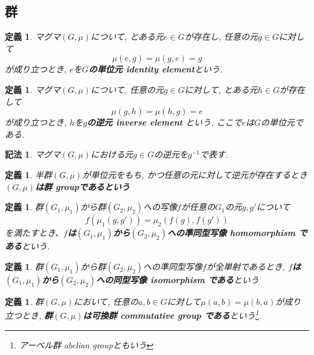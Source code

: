 \documentclass[dvipdfmx]{jsbook}
\theoremstyle{plain}
\newtheorem{Def}[thm]{定義}
\newtheorem{Notation}[thm]{記法}
\begin{document}
\subsection{群}
\begin{Def}
マグマ$(G,\mu)$について, とある元$e\in G$が存在し, 任意の元$g\in G$に対して\[\mu(e,g)=\mu(g,e)=g\]が成り立つとき, $e$を{\bf $G$の単位元 identity element}という.
\end{Def}
\begin{Def}
マグマ$(G,\mu)$について, 任意の元$g\in G$に対して, とある元$h\in G$が存在して \[\mu(g,h)=\mu(h,g)=e\]が成り立つとき, $h$を{\bf $g$の逆元 inverse element }という.
ここで$e$は$G$の単位元である.
\end{Def}
\begin{Notation}
マグマ$(G,\mu)$における元$g\in G$の逆元を$g^{-1}$で表す.
\end{Notation}
\begin{Def}
半群$(G,\mu)$が単位元をもち, かつ任意の元に対して逆元が存在するとき\bf{$(G,\mu)$は群 groupである}という
\end{Def}
\begin{Def}
群$(G_1,\mu_1)$から群$(G_2,\mu_2)$への写像$f$が任意の$G_1$の元$g, g'$について \[f(\mu_1(g,g')) = \mu_2(f(g),f(g'))\] を満たすとき、{\bf $f$は$(G_1,\mu_1)$から$(G_2,\mu_2)$への準同型写像 homomorphism である}という.
\end{Def}
\begin{Def}
群$(G_1,\mu_1)$から群$(G_2,\mu_2)$への準同型写像$f$が全単射であるとき,
{\bf $f$は$(G_1,\mu_1)$から$(G_2,\mu_2)$への同型写像 isomorphism である}という
\end{Def}
\begin{Def}
群$(G,\mu)$において,
任意の$a,b\in G$に対して$\mu(a,b)=\mu(b,a)$が成り立つとき,
{\bf 群$(G,\mu)$は可換群 commutative group である}という\footnote{アーベル群 abelian groupともいう}.
\end{Def}
\begin{comment}
\begin{Def}
位相空間$X$と自然数$n$に対して次の手続きで決定されるアーベル群$H_n(X)$を{\bf$n$次 ホモロジー群}と呼ぶ

...

\end{Def}
\end{comment}
\end{document}
